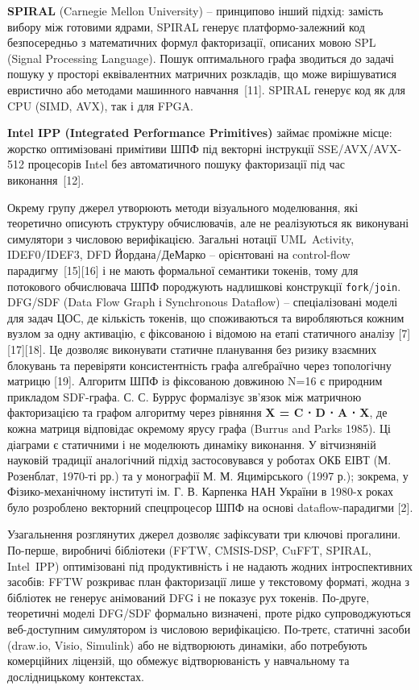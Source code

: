 \documentclass[
]{article}
\begin{document}
\textbf{SPIRAL} (Carnegie Mellon University) -- принципово інший підхід:
замість вибору між готовими ядрами, SPIRAL генерує платформо-залежний
код безпосередньо з математичних формул факторизації, описаних мовою SPL
(Signal Processing Language). Пошук оптимального графа зводиться до
задачі пошуку у просторі еквівалентних матричних розкладів, що може
вирішуватися евристично або методами машинного навчання~{[}11{]}. SPIRAL
генерує код як для CPU (SIMD, AVX), так і для FPGA.

\textbf{Intel IPP (Integrated Performance Primitives)} займає проміжне
місце: жорстко оптимізовані примітиви ШПФ під векторні інструкції
SSE/AVX/AVX-512 процесорів Intel без автоматичного пошуку факторизації
під час виконання~{[}12{]}.

Окрему групу джерел утворюють методи візуального моделювання, які
теоретично описують структуру обчислювачів, але не реалізуються як
виконувані симулятори з числовою верифікацією. Загальні нотації
UML~Activity, IDEF0/IDEF3, DFD Йордана/ДеМарко -- орієнтовані на
control-flow парадигму~{[}15{]}{[}16{]} і не мають формальної семантики
токенів, тому для потокового обчислювача ШПФ породжують надлишкові
конструкції \texttt{fork}/\texttt{join}. DFG/SDF (Data Flow Graph і
Synchronous Dataflow) -- спеціалізовані моделі для задач ЦОС, де
кількість токенів, що споживаються та виробляються кожним вузлом за одну
активацію, є фіксованою і відомою на етапі статичного аналізу
{[}7{]}{[}17{]}{[}18{]}. Це дозволяє виконувати статичне планування без
ризику взаємних блокувань та перевіряти консистентність графа
алгебраїчно через топологічну матрицю {[}19{]}. Алгоритм ШПФ із
фіксованою довжиною N=16 є природним прикладом SDF-графа. С. С. Буррус
формалізує зв'язок між матричною факторизацією та графом алгоритму через
рівняння \textbf{X\textquotesingle{} = C ⋅ D ⋅ A ⋅ X}, де кожна матриця
відповідає окремому ярусу графа (Burrus and Parks 1985). Ці діаграми є
статичними і не моделюють динаміку виконання. У вітчизняній науковій
традиції аналогічний підхід застосовувався у роботах ОКБ ЕІВТ (М.
Розенблат, 1970-ті рр.) та у монографії М. М. Яцимірського (1997 р.);
зокрема, у Фізико-механічному інституті ім. Г. В. Карпенка НАН України в
1980-х роках було розроблено векторний спецпроцесор ШПФ на основі
dataflow-парадигми {[}2{]}.

Узагальнення розглянутих джерел дозволяє зафіксувати три ключові
прогалини. По-перше, виробничі бібліотеки (FFTW, CMSIS-DSP, CuFFT,
SPIRAL, Intel~IPP) оптимізовані під продуктивність і не надають жодних
інтроспективних засобів: FFTW розкриває план факторизації лише у
текстовому форматі, жодна з бібліотек не генерує анімований DFG і не
показує рух токенів. По-друге, теоретичні моделі DFG/SDF формально
визначені, проте рідко супроводжуються веб-доступним симулятором із
числовою верифікацією. По-третє, статичні засоби (draw.io, Visio,
Simulink) або не відтворюють динаміки, або потребують комерційних
ліцензій, що обмежує відтворюваність у навчальному та дослідницькому
контекстах.
\end{document}
